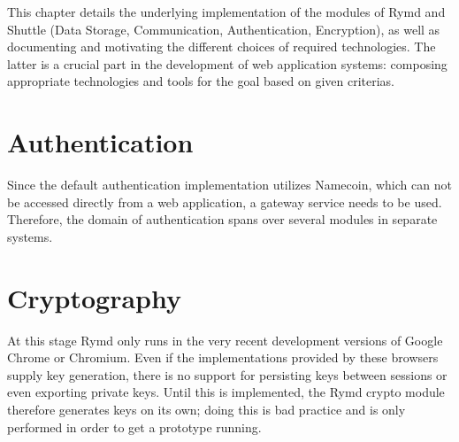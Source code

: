 This chapter details the underlying implementation of the modules of Rymd and Shuttle (Data Storage, Communication, Authentication, Encryption), as well as documenting and motivating the different choices of required technologies. The latter is a crucial part in the development of web application systems: composing appropriate technologies and tools for the goal based on given criterias.

\section{Authentication}
Since the default authentication implementation utilizes Namecoin, which can not be accessed directly from a web application, a gateway service needs to be used. Therefore, the domain of authentication spans over several modules in separate systems.



\section{Cryptography}
\label{sec:cryptography}
At this stage Rymd only runs in the very recent development versions of Google Chrome or Chromium.
Even if the implementations provided by these browsers supply key generation, there is no support for persisting keys between sessions or even exporting private keys. Until this is implemented, the Rymd crypto module therefore generates keys on its own; doing this is bad practice and is only performed in order to get a prototype running.

